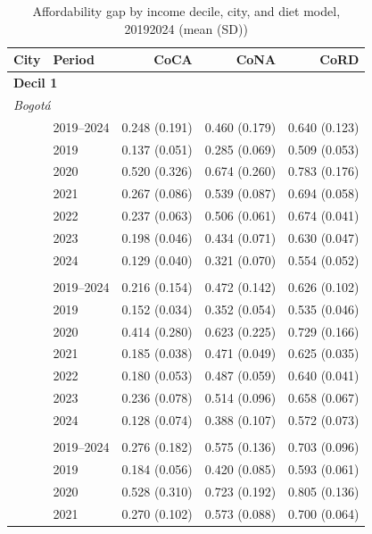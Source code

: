 \begin{table}[htbp]
\centering
\begingroup
\fontsize{8}{9.5}\selectfont
\setlength{\tabcolsep}{4pt}
\renewcommand{\arraystretch}{0.95}
\caption{Affordability gap by income decile, city, and diet model, 2019\textendash{}2024 (mean (SD))}
\label{tab:afford_gap}
\begin{tabular}{llrrr}
\toprule
City & Period & CoCA & CoNA & CoRD \\
\midrule
\multicolumn{5}{l}{\textbf{Decil 1}} \\
\multicolumn{5}{l}{\textit{Bogotá}} \\
 & 2019–2024 & 0.248 (0.191) & 0.460 (0.179) & 0.640 (0.123) \\
 & 2019 & 0.137 (0.051) & 0.285 (0.069) & 0.509 (0.053) \\
 & 2020 & 0.520 (0.326) & 0.674 (0.260) & 0.783 (0.176) \\
 & 2021 & 0.267 (0.086) & 0.539 (0.087) & 0.694 (0.058) \\
 & 2022 & 0.237 (0.063) & 0.506 (0.061) & 0.674 (0.041) \\
 & 2023 & 0.198 (0.046) & 0.434 (0.071) & 0.630 (0.047) \\
 & 2024 & 0.129 (0.040) & 0.321 (0.070) & 0.554 (0.052) \\
\addlinespace[2pt]
\multicolumn{5}{l}{\textit{Medellín}} \\
 & 2019–2024 & 0.216 (0.154) & 0.472 (0.142) & 0.626 (0.102) \\
 & 2019 & 0.152 (0.034) & 0.352 (0.054) & 0.535 (0.046) \\
 & 2020 & 0.414 (0.280) & 0.623 (0.225) & 0.729 (0.166) \\
 & 2021 & 0.185 (0.038) & 0.471 (0.049) & 0.625 (0.035) \\
 & 2022 & 0.180 (0.053) & 0.487 (0.059) & 0.640 (0.041) \\
 & 2023 & 0.236 (0.078) & 0.514 (0.096) & 0.658 (0.067) \\
 & 2024 & 0.128 (0.074) & 0.388 (0.107) & 0.572 (0.073) \\
\addlinespace[2pt]
\multicolumn{5}{l}{\textit{Cali}} \\
 & 2019–2024 & 0.276 (0.182) & 0.575 (0.136) & 0.703 (0.096) \\
 & 2019 & 0.184 (0.056) & 0.420 (0.085) & 0.593 (0.061) \\
 & 2020 & 0.528 (0.310) & 0.723 (0.192) & 0.805 (0.136) \\
 & 2021 & 0.270 (0.102) & 0.573 (0.088) & 0.700 (0.064) \\

\end{tabular}
\end{table}
